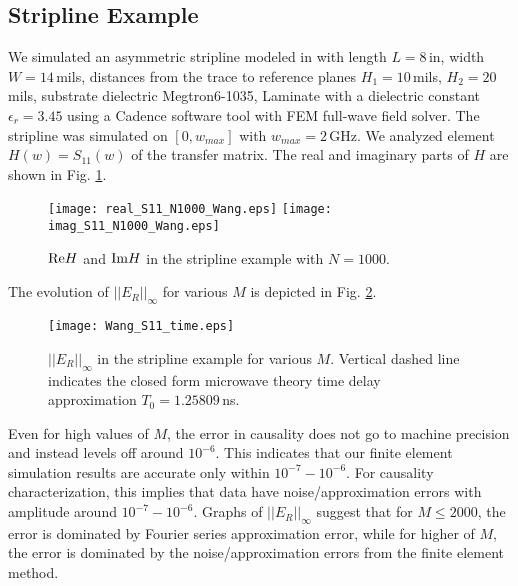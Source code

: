 \documentclass[journal,twoside]{IEEEtran}
\begin{document}
\subsection{Stripline Example} \label{Example_stripline_Wang}

We simulated an asymmetric stripline  modeled in \cite{Wang_Drewniak_Fan_Knighten_Smith_Alexander_2002} 
with length $L=8$\,in, width $W=14$\,mils, distances from the trace to reference planes $H_1=10$\,mils, $H_2=20$\, mils, substrate dielectric  Megtron6-1035, Laminate with a dielectric constant $\epsilon_r= 3.45$ using a Cadence software tool with FEM full-wave field solver. The stripline was simulated on $[0,w_{max}]$ with $w_{max}=2$\,GHz. We analyzed element $H(w)=S_{11}(w)$ of the transfer matrix. The real and imaginary parts of $H$ are shown in Fig. \ref{Wang0}.
\begin{figure} \begin{center}
\texttt{[image: real\_S11\_N1000\_Wang.eps]}
\hspace{10pt}
\texttt{[image: imag\_S11\_N1000\_Wang.eps]}
\end{center}
\caption{${\mathop{\rm Re}\nolimits} H$ and ${\mathop{\rm Im}\nolimits} H$ in the stripline  example with $N=1000$.}
\label{Wang0}
\end{figure}
The evolution of $||E_R||_\infty$ for various $M$ is depicted in Fig. \ref{Wang1}. 
\begin{figure} \begin{center}
\texttt{[image: Wang\_S11\_time.eps]}
\end{center}
\caption{$||E_R||_\infty$ in the stripline  example for various $M$. Vertical dashed line indicates the closed form microwave theory time delay approximation  $T_0=1.25809$\,ns.}
\label{Wang1}
\end{figure}
Even for high values of $M$, the error in causality does not go to machine precision and instead levels off around $10^{-6}$. This indicates that our finite element simulation results are accurate only within $10^{-7}-10^{-6}$. For causality characterization, this implies that data have noise/approximation errors with amplitude around $10^{-7}-10^{-6}$. Graphs of $||E_R||_\infty$ suggest that for $M\leq 2000$, the error is dominated by Fourier series approximation error, while for higher of $M$, the error is dominated by the noise/approximation errors from the finite element method.
\end{document}
